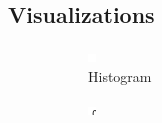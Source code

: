\documentclass[10pt, fullpage, a4paper, titlepage]{article}
\begin{document}
\subsection{Visualizations}
\begin{figure}[h]
\centering
\begin{subfigure}{0.4\linewidth}
\centering
\includegraphics[width = \linewidth]{histogram.png}
\caption{Histogram}
\end{subfigure}
\hfill
\begin{subfigure}{0.4\linewidth}
\centering
\includegraphics[width = \linewidth]{density.png}

\end{subfigure}
\end{figure}
\end{document}
